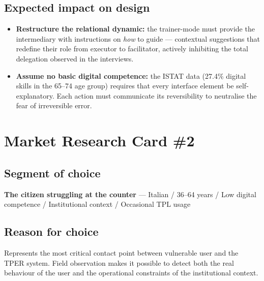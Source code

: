 ﻿\documentclass[11pt,a4paper]{article}
\begin{document}
\subsection*{Expected impact on design}
\begin{tcolorbox}[base]

\begin{itemize}[leftmargin=*,itemsep=6pt]

    \item \textbf{Restructure the relational dynamic:}
    the trainer-mode must provide the intermediary with instructions on
    \textit{how} to guide --- contextual suggestions that redefine
    their role from executor to facilitator, actively inhibiting the
    total delegation observed in the interviews.

    \item \textbf{Assume no basic digital competence:}
    the ISTAT data (27.4\% digital skills in the 65--74 age group)
    requires that every interface element be self-explanatory.
    Each action must communicate its reversibility to
    neutralise the fear of irreversible error.

\end{itemize}
\end{tcolorbox}

\newpage
\section{Market Research Card \#2}

\subsection*{Segment of choice}
\begin{tcolorbox}[base]
\textbf{The citizen struggling at the counter} --- Italian /
36--64 years / Low digital competence / Institutional context /
Occasional TPL usage
\end{tcolorbox}

\subsection*{Reason for choice}
\begin{tcolorbox}[base]
Represents the most critical contact point between vulnerable user and
the TPER system. Field observation makes it possible to detect both the
real behaviour of the user and the operational constraints of the
institutional context.
\end{tcolorbox}
\end{document}
